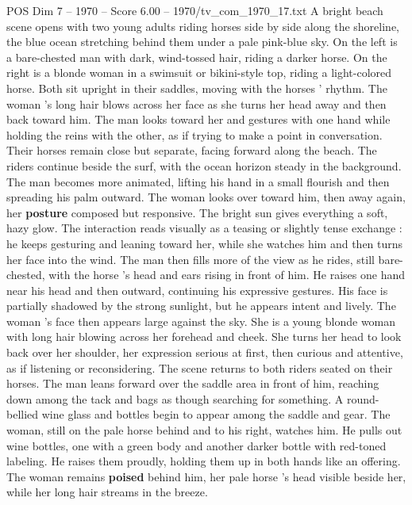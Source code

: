 \begin{textsample}{POS Dim 7 – 1970 – Score 6.00 – 1970/tv\_com\_1970\_17.txt}  \label{ex:f7_pos_036}
A bright beach scene opens with two young adults riding horses side by side along the shoreline, the blue ocean stretching behind them under a pale pink-blue sky.
On the left is a bare-chested man with dark, wind-tossed hair, riding a darker horse.
On the right is a blonde woman in a swimsuit or bikini-style top, riding a light-colored horse.
Both sit upright in their saddles, moving with the horses ’ rhythm.
The woman ’s long hair blows across her face as she turns her head away and then back toward him.
The man looks toward her and gestures with one hand while holding the reins with the other, as if trying to make a point in conversation.
Their horses remain close but separate, facing forward along the beach.
The riders continue beside the surf, with the ocean horizon steady in the background.
The man becomes more animated, lifting his hand in a small flourish and then spreading his palm outward.
The woman looks over toward him, then away again, her \textbf{posture} composed but responsive.
The bright sun gives everything a soft, hazy glow.
The interaction reads visually as a teasing or slightly tense exchange : he keeps gesturing and leaning toward her, while she watches him and then turns her face into the wind.
The man then fills more of the view as he rides, still bare-chested, with the horse ’s head and ears rising in front of him.
He raises one hand near his head and then outward, continuing his expressive gestures.
His face is partially shadowed by the strong sunlight, but he appears intent and lively.
The woman ’s face then appears large against the sky.
She is a young blonde woman with long hair blowing across her forehead and cheek.
She turns her head to look back over her shoulder, her expression serious at first, then curious and attentive, as if listening or reconsidering.
The scene returns to both riders seated on their horses.
The man leans forward over the saddle area in front of him, reaching down among the tack and bags as though searching for something.
A round-bellied wine glass and bottles begin to appear among the saddle and gear.
The woman, still on the pale horse behind and to his right, watches him.
He pulls out wine bottles, one with a green body and another darker bottle with red-toned labeling.
He raises them proudly, holding them up in both hands like an offering.
The woman remains \textbf{poised} behind him, her pale horse ’s head visible beside her, while her long hair streams in the breeze.

\end{textsample}
